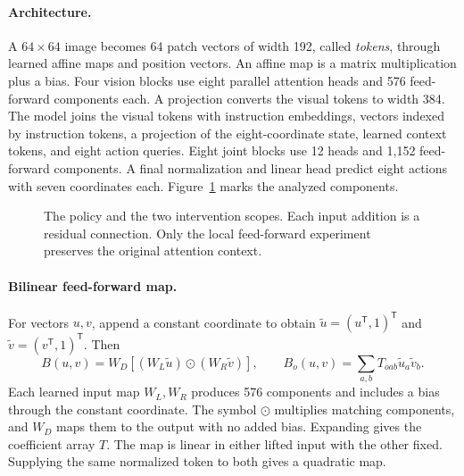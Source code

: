 \documentclass{article}
\begin{document}
\paragraph{Architecture.}
A $64\times64$ image becomes 64 patch vectors of width 192, called \emph{tokens}, through learned affine maps and position vectors. An affine map is a matrix multiplication plus a bias. Four vision blocks use eight parallel attention heads and 576 feed-forward components each. A projection converts the visual tokens to width 384. The model joins the visual tokens with instruction embeddings, vectors indexed by instruction tokens, a projection of the eight-coordinate state, learned context tokens, and eight action queries. Eight joint blocks use 12 heads and 1,152 feed-forward components. A final normalization and linear head predict eight actions with seven coordinates each. Figure~\ref{fig.architecture} marks the analyzed components.

\begin{figure}[ht]
\centering\small
\setlength{\fboxsep}{6pt}
\caption{The policy and the two intervention scopes. Each input addition is a residual connection. Only the local feed-forward experiment preserves the original attention context.}
\label{fig.architecture}
\end{figure}

\paragraph{Bilinear feed-forward map.}
For vectors $u,v$, append a constant coordinate to obtain $\tilde u=(u^{\mathsf T},1)^{\mathsf T}$ and $\tilde v=(v^{\mathsf T},1)^{\mathsf T}$. Then
\begin{equation}
 B(u,v)=W_D[(W_L\tilde u)\odot(W_R\tilde v)],
 \qquad B_o(u,v)=\sum_{a,b}T_{oab}\tilde u_a\tilde v_b.
 \label{eq.bilinear}
\end{equation}
Each learned input map $W_L,W_R$ produces 576 components and includes a bias through the constant coordinate. The symbol $\odot$ multiplies matching components, and $W_D$ maps them to the output with no added bias. Expanding gives the coefficient array $T$. The map is linear in either lifted input with the other fixed. Supplying the same normalized token to both gives a quadratic map.
\end{document}
